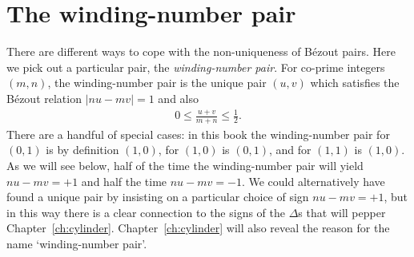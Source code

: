 \section{The winding-number pair}
\label{sec:wnp}
There are different ways to cope with the non-uniqueness of  B\'ezout pairs.
Here we pick out a particular pair, the \textit{winding-number pair}. 
For co-prime integers  $(m,n)$, the winding-number pair is the unique pair  $(u,v)$ which satisfies the B\'ezout relation $|n  u-mv| = 1$ and also
\begin{align}
	0\leq \frac{u+v}{m+n}\leq \frac{1}{2}. \label{eq:wnpFarey}
\end{align}
There are a handful of special cases: in this book the winding-number pair for  $(0,1)$ is by definition $(1,0)$, for $(1,0)$ is $(0,1)$, and for $(1,1)$ is $(1,0)$. 
As we will see below, half of the time the winding-number pair will yield $nu-mv=+1$ and half the time $n u-m v=-1$. We could alternatively have found a unique pair by insisting on a particular choice of sign $nu-mv=+1$, but in this way there is a clear connection to the signs of the $\Delta$s that will pepper Chapter~\ref{ch:cylinder}. Chapter~\ref{ch:cylinder} will also reveal the reason for the name `winding-number pair'. 


